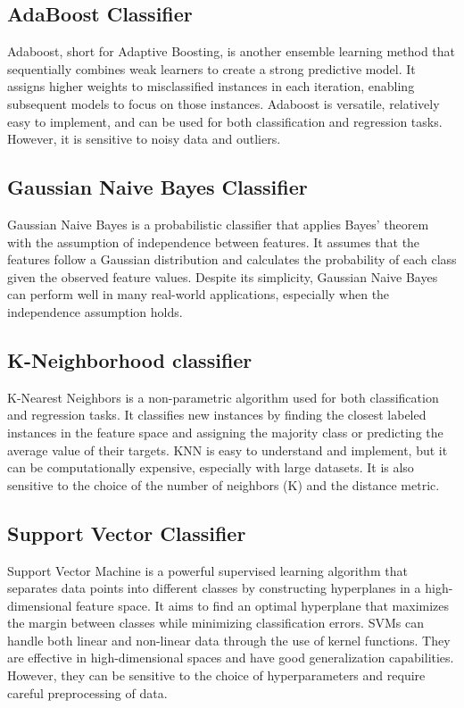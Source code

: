 \subsection{AdaBoost Classifier}
Adaboost, short for Adaptive Boosting, is another ensemble learning method that sequentially combines weak learners to create a strong predictive model. It assigns higher weights to misclassified instances in each iteration, enabling subsequent models to focus on those instances. Adaboost is versatile, relatively easy to implement, and can be used for both classification and regression tasks. However, it is sensitive to noisy data and outliers.
\subsection{Gaussian Naive Bayes Classifier}
Gaussian Naive Bayes is a probabilistic classifier that applies Bayes' theorem with the assumption of independence between features. It assumes that the features follow a Gaussian distribution and calculates the probability of each class given the observed feature values. Despite its simplicity, Gaussian Naive Bayes can perform well in many real-world applications, especially when the independence assumption holds.
\subsection{K-Neighborhood classifier}
K-Nearest Neighbors is a non-parametric algorithm used for both classification and regression tasks. It classifies new instances by finding the closest labeled instances in the feature space and assigning the majority class or predicting the average value of their targets. KNN is easy to understand and implement, but it can be computationally expensive, especially with large datasets. It is also sensitive to the choice of the number of neighbors (K) and the distance metric.
\subsection{Support Vector Classifier}
Support Vector Machine is a powerful supervised learning algorithm that separates data points into different classes by constructing hyperplanes in a high-dimensional feature space. It aims to find an optimal hyperplane that maximizes the margin between classes while minimizing classification errors. SVMs can handle both linear and non-linear data through the use of kernel functions. They are effective in high-dimensional spaces and have good generalization capabilities. However, they can be sensitive to the choice of hyperparameters and require careful preprocessing of data.

